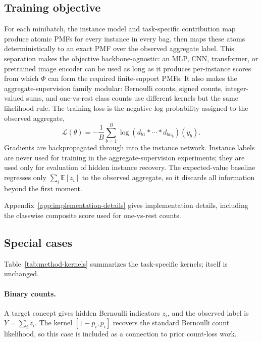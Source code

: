 \subsection{Training objective}

For each minibatch, the instance model and task-specific contribution map produce atomic PMFs for every instance in every bag.
\method{} then maps these atoms deterministically to an exact PMF over the observed aggregate label.
This separation makes the objective backbone-agnostic: an MLP, CNN, transformer, or pretrained image encoder can be used as long as it produces per-instance scores from which $\Phi$ can form the required finite-support PMFs.
It also makes the aggregate-supervision family modular: Bernoulli counts, signed counts, integer-valued sums, and one-vs-rest class counts use different kernels but the same likelihood rule.
The training loss is the negative log probability assigned to the observed aggregate,
\begin{equation}
  \mathcal{L}(\theta)
  =
  -\frac{1}{B}\sum_{b=1}^B
  \log
  \left(d_{b1} * \cdots * d_{bn_b}\right)(y_b).
\end{equation}
Gradients are backpropagated through \method{} into the instance network.
Instance labels are never used for training in the aggregate-supervision experiments; they are used only for evaluation of hidden instance recovery.
The expected-value baseline regresses only $\sum_i \mathbb{E}[z_i]$ to the observed aggregate, so it discards all information beyond the first moment.

Appendix~\ref{app:implementation-details} gives implementation details, including the classwise composite score used for one-vs-rest counts.

\subsection{Special cases}

Table~\ref{tab:method-kernels} summarizes the task-specific kernels; \method{} itself is unchanged.

\paragraph{Binary counts.}
A target concept gives hidden Bernoulli indicators $z_i$, and the observed label is $Y=\sum_i z_i$.
The kernel $[1-p_i,p_i]$ recovers the standard Bernoulli count likelihood, so this case is included as a connection to prior count-loss work.

